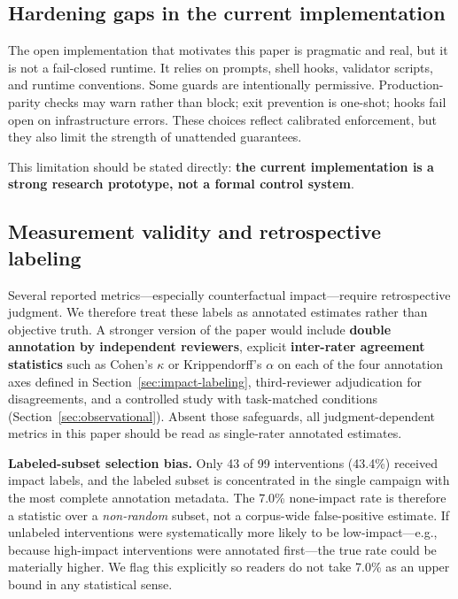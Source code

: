 \documentclass[11pt]{article}
\begin{document}
\subsection{Hardening gaps in the current implementation}

The open implementation that motivates this paper is pragmatic and real, but it is not a fail-closed runtime. It relies on prompts, shell hooks, validator scripts, and runtime conventions. Some guards are intentionally permissive. Production-parity checks may warn rather than block; exit prevention is one-shot; hooks fail open on infrastructure errors. These choices reflect calibrated enforcement, but they also limit the strength of unattended guarantees.

This limitation should be stated directly: \textbf{the current implementation is a strong research prototype, not a formal control system}.

\subsection{Measurement validity and retrospective labeling}

Several reported metrics---especially counterfactual impact---require retrospective judgment. We therefore treat these labels as annotated estimates rather than objective truth. A stronger version of the paper would include \textbf{double annotation by independent reviewers}, explicit \textbf{inter-rater agreement statistics} such as Cohen's $\kappa$ or Krippendorff's $\alpha$ on each of the four annotation axes defined in Section~\ref{sec:impact-labeling}, third-reviewer adjudication for disagreements, and a controlled study with task-matched conditions (Section~\ref{sec:observational}). Absent those safeguards, all judgment-dependent metrics in this paper should be read as single-rater annotated estimates.

\textbf{Labeled-subset selection bias.} Only 43 of 99 interventions (43.4\%) received impact labels, and the labeled subset is concentrated in the single campaign with the most complete annotation metadata. The 7.0\% none-impact rate is therefore a statistic over a \emph{non-random} subset, not a corpus-wide false-positive estimate. If unlabeled interventions were systematically more likely to be low-impact---e.g., because high-impact interventions were annotated first---the true rate could be materially higher. We flag this explicitly so readers do not take 7.0\% as an upper bound in any statistical sense.
\end{document}
